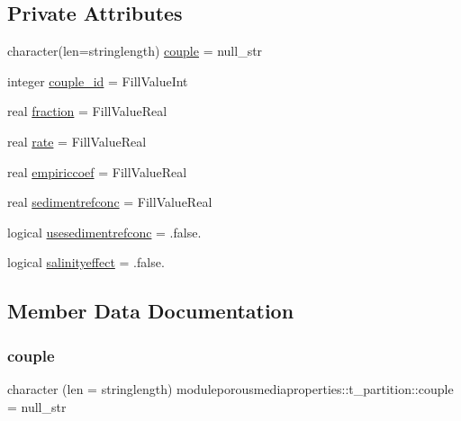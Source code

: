 \subsection*{Private Attributes}
\begin{DoxyCompactItemize}
\item 
character(len=stringlength) \mbox{\hyperlink{structmoduleporousmediaproperties_1_1t__partition_a24062ceed455059014d52a867e8c5a71}{couple}} = null\+\_\+str
\item 
integer \mbox{\hyperlink{structmoduleporousmediaproperties_1_1t__partition_aa41bc38217353776f6faa638701a38f4}{couple\+\_\+id}} = Fill\+Value\+Int
\item 
real \mbox{\hyperlink{structmoduleporousmediaproperties_1_1t__partition_a83fa3344016d43814e8d4095adf566f3}{fraction}} = Fill\+Value\+Real
\item 
real \mbox{\hyperlink{structmoduleporousmediaproperties_1_1t__partition_aa9605f384f43e9ddc1440fea483a641e}{rate}} = Fill\+Value\+Real
\item 
real \mbox{\hyperlink{structmoduleporousmediaproperties_1_1t__partition_abeaa6dfbfcd4d05739f3eee8e434dcd5}{empiriccoef}} = Fill\+Value\+Real
\item 
real \mbox{\hyperlink{structmoduleporousmediaproperties_1_1t__partition_a7fbce01aeff5adf7ed3d3eec0f498d8f}{sedimentrefconc}} = Fill\+Value\+Real
\item 
logical \mbox{\hyperlink{structmoduleporousmediaproperties_1_1t__partition_a9b27c6e69873f30d00ac0b26712139e2}{usesedimentrefconc}} = .false.
\item 
logical \mbox{\hyperlink{structmoduleporousmediaproperties_1_1t__partition_ace0a6e12baa042ad64b3071153ae638f}{salinityeffect}} = .false.
\end{DoxyCompactItemize}


\subsection{Member Data Documentation}
\mbox{\label{structmoduleporousmediaproperties_1_1t__partition_a24062ceed455059014d52a867e8c5a71}} 
\subsubsection{\texorpdfstring{couple}{couple}}
{\footnotesize\ttfamily character (len = stringlength) moduleporousmediaproperties\+::t\+\_\+partition\+::couple = null\+\_\+str\hspace{0.3cm}{\ttfamily [private]}}

